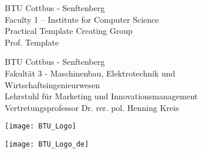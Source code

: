 %
%
%
\begin{en}
\end{en}
\begin{de}
\end{de}
%
\thispagestyle{empty}
%
%
\begin{figure}[ht]
\begin{minipage}[l]{0.65\textwidth}
\begin{flushleft}	
\begin{en}
	BTU Cottbus - Senftenberg\\[0.3em]
    Faculty 1 -- Institute for Computer Science\\[0.3em]
    Practical Template Creating Group\\[0.3em]
    Prof. Template
\end{en}
\begin{de}
    BTU Cottbus - Senftenberg\\[0.3em]
    Fakult\"at 3 - Maschinenbau, Elektrotechnik und Wirtschaftsingenieurwesen \\[0.3em]
    Lehrstuhl f\"ur Marketing und Innovationsmanagement\\[0.3em]
    Vertretungsprofessor Dr. rer. pol. Henning Kreis  
\end{de}
\end{flushleft}	
\end{minipage}%
\begin{minipage}[r]{0.35\textwidth}
\begin{flushright}	
\begin{en}
	\texttt{[image: BTU\_Logo]}
\end{en}
\begin{de}
	\texttt{[image: BTU\_Logo\_de]}
\end{de}
\end{flushright}	
\end{minipage} 
\end{figure}
